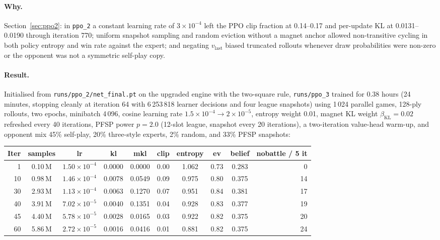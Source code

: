 \paragraph{Why.} Section~\ref{sec:ppo2}: in \texttt{ppo\_2} a constant learning rate of
$3 \times 10^{-4}$ left the PPO clip fraction at 0.14--0.17 and per-update KL at 0.0131--0.0190
through iteration 770; uniform snapshot sampling and random eviction without a magnet anchor
allowed non-transitive cycling in both policy entropy and win rate against the expert; and
negating $v_{\text{last}}$ biased truncated rollouts whenever draw probabilities were non-zero or
the opponent was not a symmetric self-play copy.

\paragraph{Result.} Initialised from \texttt{runs/ppo\_2/net\_final.pt} on the upgraded engine with
the two-square rule, \texttt{runs/ppo\_3} trained for 0.38 hours (24 minutes, stopping cleanly at
iteration 64 with 6\,253\,818 learner decisions and four league snapshots) using 1\,024 parallel
games, 128-ply rollouts, two epochs, minibatch 4\,096, cosine learning rate
$1.5 \times 10^{-4} \to 2 \times 10^{-5}$, entropy weight 0.01, magnet KL weight
$\beta_{\text{KL}} = 0.02$ refreshed every 40 iterations, PFSP power $p = 2.0$ (12-slot league,
snapshot every 20 iterations), a two-iteration value-head warm-up, and opponent mix 45\% self-play,
20\% three-style experts, 2\% random, and 33\% PFSP snapshots:
\begin{center}
\small
\begin{tabular}{rccccccccr}
\toprule
Iter & samples & lr & kl & mkl & clip & entropy & ev & belief & nobattle / 5 it \\
\midrule
1  & 0.10\,M & $1.50 \times 10^{-4}$ & 0.0000 & 0.0000 & 0.00 & 1.062 & 0.73 & 0.283 & 0  \\
10 & 0.98\,M & $1.46 \times 10^{-4}$ & 0.0078 & 0.0549 & 0.09 & 0.975 & 0.80 & 0.375 & 14 \\
30 & 2.93\,M & $1.13 \times 10^{-4}$ & 0.0063 & 0.1270 & 0.07 & 0.951 & 0.84 & 0.381 & 17 \\
40 & 3.91\,M & $7.02 \times 10^{-5}$ & 0.0040 & 0.1351 & 0.04 & 0.928 & 0.83 & 0.377 & 19 \\
45 & 4.40\,M & $5.78 \times 10^{-5}$ & 0.0028 & 0.0165 & 0.03 & 0.922 & 0.82 & 0.375 & 20 \\
60 & 5.86\,M & $2.72 \times 10^{-5}$ & 0.0016 & 0.0416 & 0.01 & 0.881 & 0.82 & 0.375 & 24 \\
\bottomrule
\end{tabular}
\end{center}
